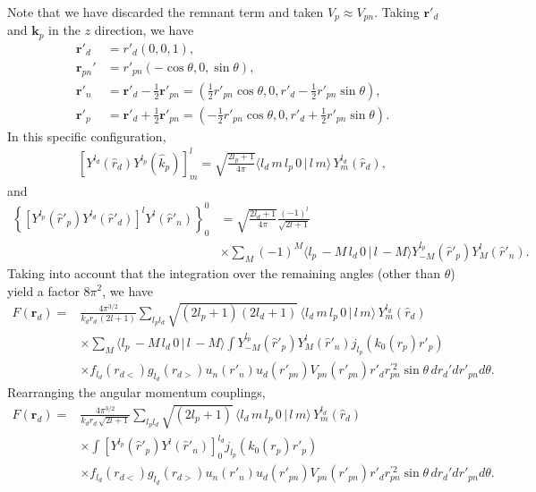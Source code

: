 \documentclass[a4paper,11pt]{article}
\begin{document}
Note that we have discarded the remnant term and taken $V_{p}\approx V_{pn}$.
Taking $\mathbf r'_d$ and $\mathbf k_p$ in the $z$ direction, we have
\begin{align}\label{eq43}
\nonumber\mathbf r'_d&=r'_d\left(0,0,1\right),\\
\nonumber\mathbf r_{pn}'&=r'_{pn}\left(-\cos\theta,0,\sin\theta\right),\\
\nonumber \mathbf r'_{n}&=\mathbf r'_d-\frac{1}{2}\mathbf r'_{pn}=\left(\frac{1}{2}r'_{pn}\cos\theta,0,r'_d-\frac{1}{2}r'_{pn}\sin\theta\right),\\
 \mathbf r'_{p}&=\mathbf r'_d+\frac{1}{2}\mathbf r'_{pn}=\left(-\frac{1}{2}r'_{pn}\cos\theta,0,r'_d+\frac{1}{2}r'_{pn}\sin\theta\right).
\end{align}
In this specific configuration,
 \begin{align}\label{eq72}
\left[Y^{l_d}(\hat r_d) Y^{l_p}(\hat k_p)\right]^l_m=\sqrt{\frac{2l_p+1}{4\pi}}\langle l_d\,m\,l_p\,0\,|\,l\,m\rangle \,Y^{l_d}_m(\hat r_d),
 \end{align}
 and
  \begin{align}\label{eq73}
  \nonumber \left\{\left[Y^{l_p}(\hat r'_p)Y^{l_d}(\hat r'_d)\right]^lY^l(\hat r'_n)\right\}^0_0&=\sqrt{\frac{2l_d+1}{4\pi}}\frac{(-1)^{l}}{\sqrt{2l+1}}\\
  &\times\sum_{M}(-1)^M\langle l_p\,-M\,l_d\,0\,|\,l\,-M\rangle    Y^{l_p}_{-M}(\hat r'_p)Y^{l}_{M}(\hat r'_n).
  \end{align}
  Taking into account that the integration over the remaining angles (other than $\theta$) yield a factor $8\pi^2$, we have
 \begin{align}\label{eq74}
 \nonumber F(\mathbf r_d)=&\frac{4\pi^{3/2}}{k_dr_d\,(2l+1)}\sum_{l_pl_d}\sqrt{(2l_p+1)(2l_d+1)}\,\langle l_d\,m\,l_p\,0\,|\,l\,m\rangle\,Y^{l_d}_m(\hat r_d)\\
 \nonumber&\times\sum_{M}\langle l_p\,-M\,l_d\,0\,|\,l\,-M\rangle  \int  Y^{l_p}_{-M}(\hat r'_p)Y^{l}_{M}(\hat r'_n)j_{l_p}(k_0(r_p) r'_p)\\
 &\times f_{l_d}(r_{d<})g_{l_d}(r_{d>})u_n(r'_n)u_d(r'_{pn}) V_{pn}(r'_{pn}) r'_dr_{pn}^{'2}\sin\theta\, d r_d'dr'_{pn}d\theta.
 \end{align}
 Rearranging the angular momentum couplings, 
  \begin{align}\label{eq85}
  \nonumber F(\mathbf r_d)=&\frac{4\pi^{3/2}}{k_dr_d\,\sqrt{2l+1}}\sum_{l_pl_d}\sqrt{(2l_p+1)}\,\langle l_d\,m\,l_p\,0\,|\,l\,m\rangle\,Y^{l_d}_m(\hat r_d)\\
  \nonumber&\times  \int  \left[Y^{l_p}(\hat r'_p)Y^{l}(\hat r'_n)\right]^{l_d}_0j_{l_p}(k_0(r_p) r'_p)\\
  &\times f_{l_d}(r_{d<})g_{l_d}(r_{d>})u_n(r'_n)u_d(r'_{pn}) V_{pn}(r'_{pn}) r'_dr_{pn}^{'2}\sin\theta\, d r_d'dr'_{pn}d\theta.
  \end{align}
\end{document}

